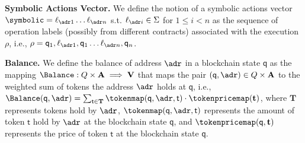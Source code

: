 

\noindent
\textbf{Symbolic Actions Vector.}
We define the notion of a symbolic actions vector $\symbolic = \ell_{\adr 1} \ldots \ell_{\adr n}$ s.t.  $\ell_{\adr i}\in \Sigma$ for $1\leq i<n$ as the sequence of operation labels (possibly from different  contracts) associated with the execution $\rho$, i.e., $\rho = \mathsf{q}_1, \ell_{\adr 1},\mathsf{q}_1\ldots \ell_{\adr n},\mathsf{q}_n$. 
 







\noindent
\textbf{Balance.} 
We define the balance of address $\adr$ in a blockchain state $\mathsf{q}$ as the mapping $\Balance: Q \times \mathbf{A} \implies \mathbf{V}$
    that maps the pair $(\mathsf{q},\adr) \in Q \times \mathbf{A}$ to the weighted sum of tokens the address $\adr$ holds at $\mathsf{q}$, i.e., 
    $\Balance(\mathsf{q},\adr)= \sum_{\mathsf{t} \in \mathbf{T}}{\tokenmap(\mathsf{q},\adr,\mathsf{t}) \cdot \tokenpricemap(\mathbf{t})}$, where $\mathbf{T}$ represents tokens hold by $\adr$, $\tokenmap(\mathsf{q},\adr,\mathsf{t})$ represents the amount of token $\mathsf{t}$ hold by $\adr$ at the blockchain state $\mathsf{q}$, and $\tokenpricemap(\mathsf{q}, \mathbf{t})$ represents the price of token $\mathsf{t}$ at the blockchain state $\mathsf{q}$.


